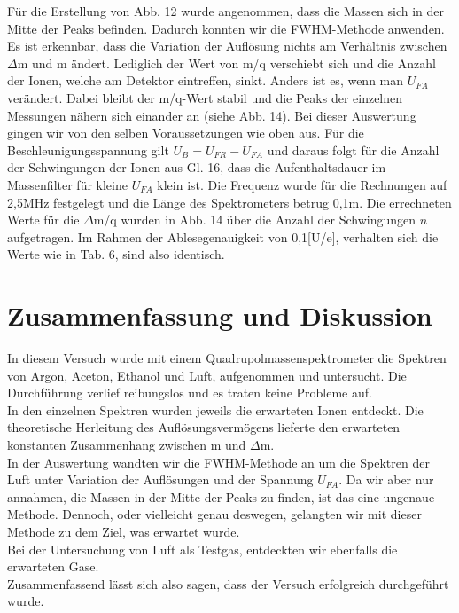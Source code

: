 Für die Erstellung von Abb. 12 wurde angenommen, dass die Massen sich in der Mitte der Peaks befinden. Dadurch konnten wir die FWHM-Methode anwenden. Es ist erkennbar, dass die Variation der Auflösung nichts am Verhältnis zwischen $\Delta$m und m ändert. Lediglich der Wert von m/q verschiebt sich und die Anzahl der Ionen, welche am Detektor eintreffen, sinkt. Anders ist es, wenn man $U_{FA}$ verändert. Dabei bleibt der m/q-Wert stabil und die Peaks der einzelnen Messungen nähern sich einander an (siehe Abb. 14). Bei dieser Auswertung gingen wir von den selben Voraussetzungen wie oben  aus. Für die Beschleunigungsspannung gilt $U_{B} = U_{FR}-U_{FA}$ und daraus folgt für die Anzahl der Schwingungen der Ionen aus Gl. 16, dass die Aufenthaltsdauer im Massenfilter für kleine $U_{FA}$ klein ist. Die Frequenz wurde für die Rechnungen auf 2,5MHz festgelegt und die Länge des Spektrometers betrug 0,1m. Die errechneten Werte für die $\Delta$m/q wurden in Abb. 14 über die Anzahl der Schwingungen $n$ aufgetragen. Im Rahmen der Ablesegenauigkeit von 0,1[U/e], verhalten sich die Werte wie in Tab. 6, sind also identisch.


\section{Zusammenfassung und Diskussion}
In diesem Versuch wurde mit einem Quadrupolmassenspektrometer die Spektren von Argon, Aceton, Ethanol und Luft, aufgenommen und untersucht. Die Durchführung verlief reibungslos und es traten keine Probleme auf.\\
In den einzelnen Spektren wurden jeweils die erwarteten Ionen entdeckt. Die theoretische Herleitung des Auflösungsvermögens lieferte den erwarteten konstanten Zusammenhang zwischen m und $\Delta$m.\\
In der Auswertung wandten wir die FWHM-Methode an um die Spektren der Luft unter Variation der Auflösungen und der Spannung $U_{FA}$. Da wir aber nur annahmen, die Massen in der Mitte der Peaks zu finden, ist das eine ungenaue Methode. Dennoch, oder vielleicht genau deswegen, gelangten wir mit dieser Methode zu dem Ziel, was erwartet wurde.\\
Bei der Untersuchung von Luft als Testgas, entdeckten wir ebenfalls die erwarteten Gase.\\
Zusammenfassend lässt sich also sagen, dass der Versuch erfolgreich durchgeführt wurde.